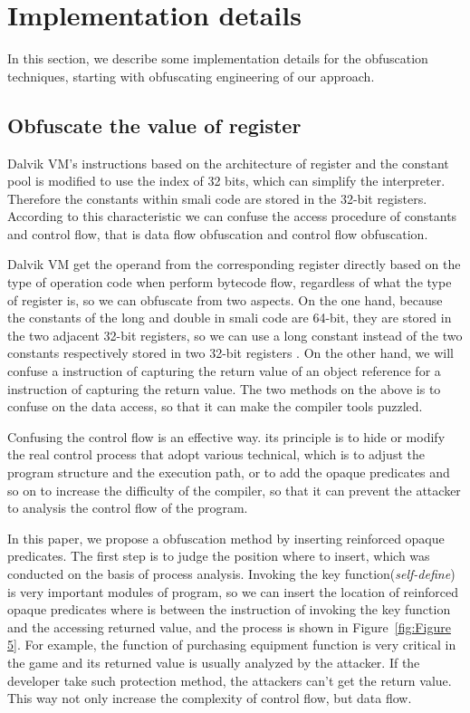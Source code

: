 \section{Implementation details}
In this section, we describe some implementation details for the obfuscation techniques, starting with obfuscating engineering of our approach.
\subsection{Obfuscate the value of register}
Dalvik VM's instructions based on the architecture of register and the constant pool is modified to use the index of 32 bits, which can simplify the interpreter. Therefore the constants within smali code  are stored in the 32-bit registers. According to this characteristic we can confuse the access procedure of constants and control flow, that is data flow obfuscation and control flow obfuscation.

Dalvik VM get the operand from the corresponding register directly based on the type of operation code when perform bytecode flow, regardless of what the type of register is, so we can obfuscate from two aspects. On the one hand, because the constants of the long  and double in smali code are 64-bit, they are stored in the two adjacent 32-bit registers, so we can use a long constant instead of the two constants respectively stored in two 32-bit registers . On the other hand, we will confuse a instruction of capturing the return value of an object reference for a instruction of capturing the return value. The two methods on the above is to confuse on the data access, so that it can make the compiler tools puzzled.

Confusing the control flow is an effective way. its principle is to hide or modify the real control process that adopt various technical, which is to adjust the program structure and the execution path, or to add the opaque predicates and so on to increase the difficulty of the compiler, so that it can prevent the attacker to analysis the control flow of the program\cite{12}.

In this paper, we propose a obfuscation method by inserting reinforced opaque predicates\cite{07}. The first step is to judge the position where to insert, which was conducted on the basis of process analysis. Invoking the key function(\emph{self-define}) is very important modules of program, so we can insert the location of reinforced opaque predicates where is between the instruction of invoking the key function and  the accessing returned value, and the process is shown in Figure~\ref{fig:Figure 5}. For example, the function of purchasing equipment function is very critical in the game and its returned value is usually analyzed by the attacker. If the developer take such protection method, the attackers can't get the return value. This way not only increase the complexity of control flow, but data flow.

